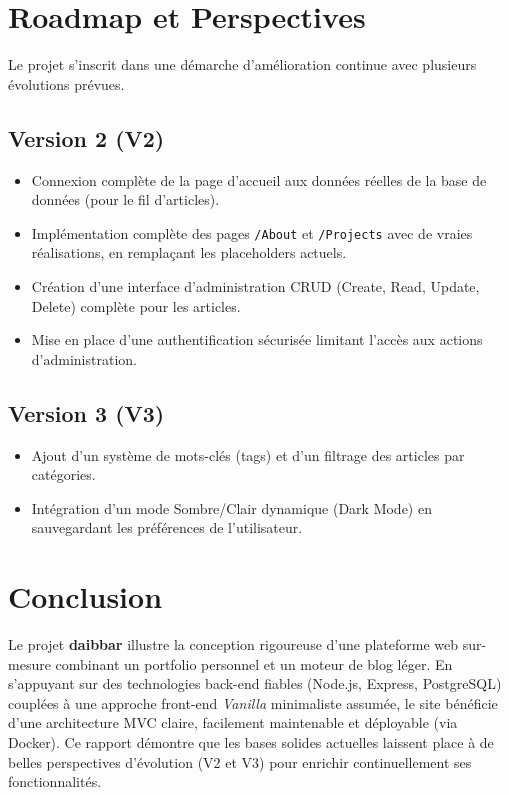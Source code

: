 \documentclass[12pt,a4paper]{article}
\begin{document}
\section{Roadmap et Perspectives}

Le projet s'inscrit dans une démarche d'amélioration continue avec plusieurs évolutions prévues.

\subsection{Version 2 (V2)}
\begin{itemize}
    \item Connexion complète de la page d'accueil aux données réelles de la base de données (pour le fil d'articles).
    \item Implémentation complète des pages \texttt{/About} et \texttt{/Projects} avec de vraies réalisations, en remplaçant les placeholders actuels.
    \item Création d'une interface d'administration CRUD (Create, Read, Update, Delete) complète pour les articles.
    \item Mise en place d'une authentification sécurisée limitant l'accès aux actions d'administration.
\end{itemize}

\subsection{Version 3 (V3)}
\begin{itemize}
    \item Ajout d'un système de mots-clés (tags) et d'un filtrage des articles par catégories.
    \item Intégration d'un mode Sombre/Clair dynamique (Dark Mode) en sauvegardant les préférences de l'utilisateur.
\end{itemize}

\section{Conclusion}

Le projet \textbf{daibbar} illustre la conception rigoureuse d'une plateforme web sur-mesure combinant un portfolio personnel et un moteur de blog léger. En s'appuyant sur des technologies back-end fiables (Node.js, Express, PostgreSQL) couplées à une approche front-end \textit{Vanilla} minimaliste assumée, le site bénéficie d'une architecture MVC claire, facilement maintenable et déployable (via Docker). Ce rapport démontre que les bases solides actuelles laissent place à de belles perspectives d'évolution (V2 et V3) pour enrichir continuellement ses fonctionnalités.
\end{document}
